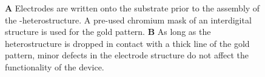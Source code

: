 \begin{figure}
\begin{subfigure}{0.4\textwidth}
\end{subfigure}
\begin{subfigure}{0.4\textwidth}
	\caption{}
\end{subfigure}
\caption{\textbf{A} Electrodes are written onto the substrate prior to the assembly of the \hbn-\tmdg heterostructure. A pre-used chromium mask of an interdigital structure is used for the gold pattern. \textbf{B} As long as the heterostructure is dropped in contact with a thick line of the gold pattern, minor defects in the electrode structure do not affect the functionality of the device.}
	\label{pattern}
\end{figure}

